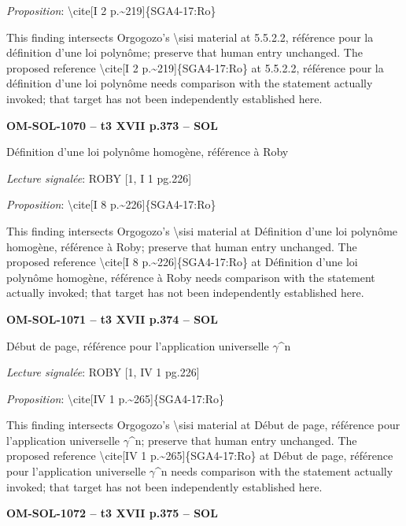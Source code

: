 \emph{Proposition}: \textbackslash{}cite[I 2 p.\textasciitilde{}219]\{SGA4-17:Ro\}\par
This finding intersects Orgogozo's \textbackslash{}sisi material at 5.5.2.2, référence pour la définition d'une loi polynôme; preserve that human entry unchanged. The proposed reference \textbackslash{}cite[I 2 p.\textasciitilde{}219]\{SGA4-17:Ro\} at 5.5.2.2, référence pour la définition d'une loi polynôme needs comparison with the statement actually invoked; that target has not been independently established here.\par
\par\noindent\textbf{OM-SOL-1070 -- t3 XVII p.373 -- SOL}\par
Définition d'une loi polynôme homogène, référence à Roby\par
\emph{Lecture signalée}: ROBY [1, I 1 pg.226]\par
\emph{Proposition}: \textbackslash{}cite[I 8 p.\textasciitilde{}226]\{SGA4-17:Ro\}\par
This finding intersects Orgogozo's \textbackslash{}sisi material at Définition d'une loi polynôme homogène, référence à Roby; preserve that human entry unchanged. The proposed reference \textbackslash{}cite[I 8 p.\textasciitilde{}226]\{SGA4-17:Ro\} at Définition d'une loi polynôme homogène, référence à Roby needs comparison with the statement actually invoked; that target has not been independently established here.\par
\par\noindent\textbf{OM-SOL-1071 -- t3 XVII p.374 -- SOL}\par
Début de page, référence pour l'application universelle \ensuremath{\gamma}\textasciicircum{}n\par
\emph{Lecture signalée}: ROBY [1, IV 1 pg.226]\par
\emph{Proposition}: \textbackslash{}cite[IV 1 p.\textasciitilde{}265]\{SGA4-17:Ro\}\par
This finding intersects Orgogozo's \textbackslash{}sisi material at Début de page, référence pour l'application universelle \ensuremath{\gamma}\textasciicircum{}n; preserve that human entry unchanged. The proposed reference \textbackslash{}cite[IV 1 p.\textasciitilde{}265]\{SGA4-17:Ro\} at Début de page, référence pour l'application universelle \ensuremath{\gamma}\textasciicircum{}n needs comparison with the statement actually invoked; that target has not been independently established here.\par
\par\noindent\textbf{OM-SOL-1072 -- t3 XVII p.375 -- SOL}\par
